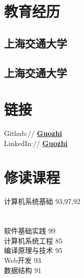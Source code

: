 \documentclass[]{deedy-resume-openfont}
\begin{document}
%
%
\lastupdated

%
%

%
%

\begin{minipage}[t]{0.25\textwidth} 


\section{教育经历} 
\sectionsep

\subsection{上海交通大学}
\sectionsep

\subsection{上海交通大学}
\sectionsep


\section{链接}
\sectionsep  
Github:// \href{https://github.com/Guozhi-explore}{\bf Guozhi} \\
LinkedIn://  \href{https://www.linkedin.com/in/zhi-guo-316892186}{\bf Guozhi} \\
\sectionsep


\section{修读课程}
 计算机系统基础  93,97,92 \\
 \\ \hspace*{\fill} \\
 软件基础实践 99\\
 计算机系统工程 85 \\
 编译原理与技术 95 \\
 Web开发 93 \\
 数据结构 91 \\
 \sectionsep


\end{minipage}
\end{document}
